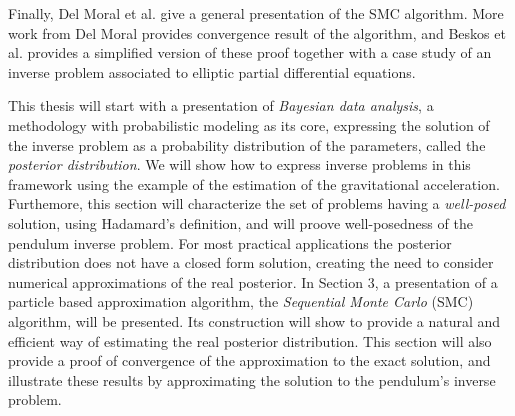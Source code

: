 Finally, Del Moral et al. \cite{del_moral_2006} give a general presentation of the SMC algorithm. More work from Del Moral \cite{del2013mean, del2004feynman} provides convergence result of the algorithm, and Beskos et al. \cite{beskos2015sequential} provides a simplified version of these proof together with a case study of an inverse problem associated to elliptic partial differential equations. 

This thesis will start with a presentation of \textit{Bayesian data analysis}, a methodology with probabilistic modeling as its core, expressing the solution of the inverse problem as a probability distribution of the parameters, called the \textit{posterior distribution}. We will show how to express inverse problems in this framework using the example of the estimation of the gravitational acceleration. Furthemore, this section will characterize the set of problems having a \textit{well-posed} solution, using Hadamard's \cite{hadamard} definition, and will proove well-posedness of the pendulum inverse problem. For most practical applications the posterior distribution does not have a closed form solution, creating the need to consider numerical approximations of the real posterior. In Section 3, a presentation of a particle based approximation algorithm, the \textit{Sequential Monte Carlo} (SMC) algorithm, will be presented. Its construction will show to provide a natural and efficient way of estimating the real posterior distribution. This section will also provide a proof of convergence of the approximation to the exact solution, and illustrate these results by approximating the solution to the pendulum's inverse problem.




